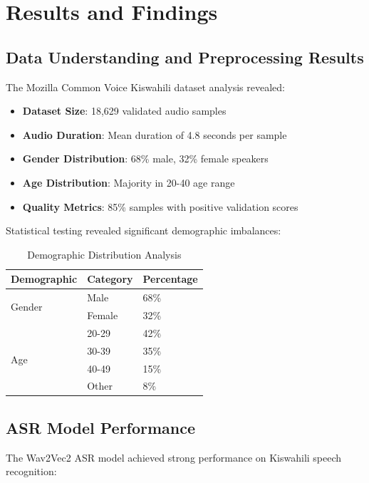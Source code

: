 \documentclass[12pt,a4paper]{report}
\begin{document}
\section{Results and Findings}
\subsection{Data Understanding and Preprocessing Results}
The Mozilla Common Voice Kiswahili dataset analysis revealed:

\begin{itemize}
    \item \textbf{Dataset Size}: 18,629 validated audio samples
    \item \textbf{Audio Duration}: Mean duration of 4.8 seconds per sample
    \item \textbf{Gender Distribution}: 68\% male, 32\% female speakers
    \item \textbf{Age Distribution}: Majority in 20-40 age range
    \item \textbf{Quality Metrics}: 85\% samples with positive validation scores
\end{itemize}

Statistical testing revealed significant demographic imbalances:

\begin{table}[H]
\centering
\caption{Demographic Distribution Analysis}
\label{tab:demographics}
\begin{tabular}{@{}lll@{}}
\toprule
\textbf{Demographic} & \textbf{Category} & \textbf{Percentage} \\ \midrule
\multirow{2}{*}{Gender} & Male & 68\% \\
                        & Female & 32\% \\
\midrule
\multirow{4}{*}{Age} & 20-29 & 42\% \\
                     & 30-39 & 35\% \\
                     & 40-49 & 15\% \\
                     & Other & 8\% \\ \bottomrule
\end{tabular}
\end{table}

\subsection{ASR Model Performance}
The Wav2Vec2 ASR model achieved strong performance on Kiswahili speech recognition:
\end{document}
